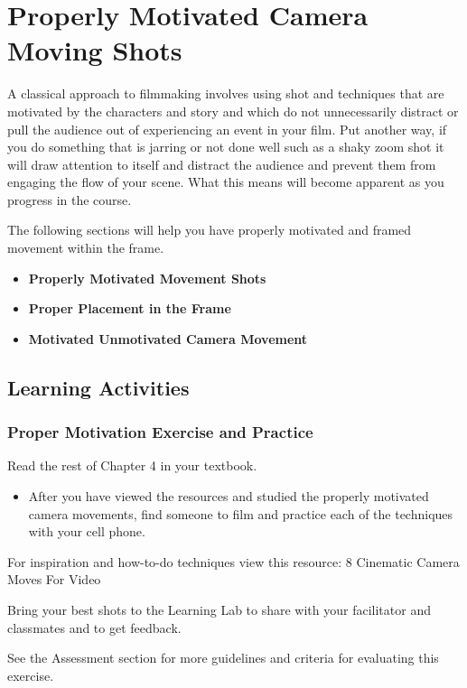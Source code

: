 \documentclass[
]{book}
\providecommand{\tightlist}{%
  \setlength{\itemsep}{0pt}\setlength{\parskip}{0pt}}
\begin{document}
\hypertarget{properly-motivated-camera-moving-shots}{%
\section{Properly Motivated Camera Moving Shots}\label{properly-motivated-camera-moving-shots}}

A classical approach to filmmaking involves using shot and techniques that are motivated by the characters and story and which do not unnecessarily distract or pull the audience out of experiencing an event in your film. Put another way, if you do something that is jarring or not done well such as a shaky zoom shot it will draw attention to itself and distract the audience and prevent them from engaging the flow of your scene. What this means will become apparent as you progress in the course.

The following sections will help you have properly motivated and framed movement within the frame.

\begin{itemize}
\tightlist
\item
  \textbf{Properly Motivated Movement Shots}
\item
  \textbf{Proper Placement in the Frame}
\item
  \textbf{Motivated Unmotivated Camera Movement}
\end{itemize}

\hypertarget{learning-activities-11}{%
\subsection*{Learning Activities}\label{learning-activities-11}}

\begin{reflect}
\hypertarget{proper-motivation-exercise-and-practice}{%
\subsubsection*{Proper Motivation Exercise and Practice}\label{proper-motivation-exercise-and-practice}}

Read the rest of Chapter 4 in your textbook.

\begin{itemize}
\tightlist
\item
  After you have viewed the resources and studied the properly motivated camera movements, find someone to film and practice each of the techniques with your cell phone.
\end{itemize}

For inspiration and how-to-do techniques view this resource: 8 Cinematic Camera Moves For Video

Bring your best shots to the Learning Lab to share with your facilitator and classmates and to get feedback.

See the Assessment section for more guidelines and criteria for evaluating this exercise.
\end{reflect}
\end{document}
